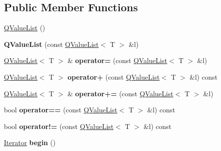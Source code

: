 \subsection*{Public Member Functions}
\begin{DoxyCompactItemize}
\item 
\mbox{\hyperlink{class_q_value_list_ab510376a550afa49444ef73aa64bd057}{Q\+Value\+List}} ()
\item 
\mbox{\label{class_q_value_list_aff4011e3853386e396274669a259eb85}} 
{\bfseries Q\+Value\+List} (const \mbox{\hyperlink{class_q_value_list}{Q\+Value\+List}}$<$ T $>$ \&l)
\item 
\mbox{\label{class_q_value_list_aa22c14655a83ab12603d3cd090b96f7b}} 
\mbox{\hyperlink{class_q_value_list}{Q\+Value\+List}}$<$ T $>$ \& {\bfseries operator=} (const \mbox{\hyperlink{class_q_value_list}{Q\+Value\+List}}$<$ T $>$ \&l)
\item 
\mbox{\label{class_q_value_list_a8d5f4fd81c0425224c24e52ccb790dcc}} 
\mbox{\hyperlink{class_q_value_list}{Q\+Value\+List}}$<$ T $>$ {\bfseries operator+} (const \mbox{\hyperlink{class_q_value_list}{Q\+Value\+List}}$<$ T $>$ \&l) const
\item 
\mbox{\label{class_q_value_list_a8e29ee0d5707ad877cc9923f6bfd0b1c}} 
\mbox{\hyperlink{class_q_value_list}{Q\+Value\+List}}$<$ T $>$ \& {\bfseries operator+=} (const \mbox{\hyperlink{class_q_value_list}{Q\+Value\+List}}$<$ T $>$ \&l)
\item 
\mbox{\label{class_q_value_list_a25866d7ce5b9ab5af5792b68562cce89}} 
bool {\bfseries operator==} (const \mbox{\hyperlink{class_q_value_list}{Q\+Value\+List}}$<$ T $>$ \&l) const
\item 
\mbox{\label{class_q_value_list_a14abcd731d0e2162a069b868476265b2}} 
bool {\bfseries operator!=} (const \mbox{\hyperlink{class_q_value_list}{Q\+Value\+List}}$<$ T $>$ \&l) const
\item 
\mbox{\label{class_q_value_list_a3b1ace97594172548eae37aea9c21b40}} 
\mbox{\hyperlink{class_q_value_list_a043c8661906b45f062d493601804a5ea}{Iterator}} {\bfseries begin} ()
\item 

\end{DoxyCompactItemize}
